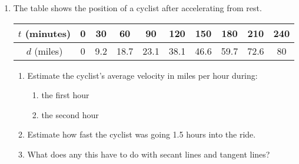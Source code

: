\documentclass[11pt,fleqn]{article}
\begin{document}
\begin{enumerate}
\item The table shows the position of a cyclist after accelerating from rest.\\

\begin{tabular}{|c||c|c|c|c|c|c|c|c|c|}
$t$ (minutes) &0&30&60&90&120&150&180&210&240\\
\hline
$d$ (miles) &0&9.2&18.7&23.1&38.1&46.6&59.7&72.6&80\\
\end{tabular}
\begin{enumerate}
\item Estimate the cyclist's average velocity in miles per hour  during:
\begin{enumerate}
\item the first hour\\ \vfill
\item the second hour\\ \vfill
\end{enumerate}
\item Estimate how fast the cyclist was going 1.5 hours into the ride.\\  \vspace{2.5in}

\item What does any this have to do with secant lines and tangent lines?
\vfill
\end{enumerate}
\end{enumerate}
\end{document}

